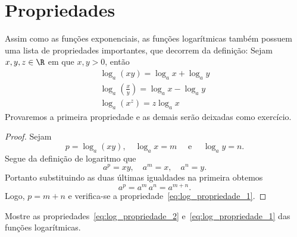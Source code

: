 \section{Propriedades}

Assim como as funções exponenciais, as funções logarítmicas também possuem uma
lista de propriedades importantes, que decorrem da definição: Sejam
$x, y, z \in \R$ em que $x, y > 0$, então
\begin{gather}
  \log_a (xy)                     = \log_a x + \log_a y \label{eq:log_propriedade_1}\\[3mm]
  \log_a \left(\frac{x}{y}\right) = \log_a x - \log_a y \label{eq:log_propriedade_2}\\[3mm]
  \log_a \left(x^z\right)         = z\log_a x           \label{eq:log_propriedade_3}
\end{gather}
Provaremos a primeira propriedade e as demais serão deixadas como exercício.

\begin{proof}
  Sejam
  \[
    p = \log_a (xy), \quad \log_a x = m \quad\text{ e } \quad \log_a y = n .
  \]
  Segue da definição de logaritmo que
  \[
    a^p = xy, \quad a^m = x, \quad a^n = y.
  \]
  Portanto substituindo as duas últimas igualdades na primeira obtemos
  \[
    a^p
    = a^m \, a^n
    = a^{m+n}.
  \]
  Logo, $p=m+n$ e verifica-se a propriedade~\eqref{eq:log_propriedade_1}.
\end{proof}

Mostre as propriedades~\eqref{eq:log_propriedade_2}
e~\eqref{eq:log_propriedade_1} das funções logarítmicas.

